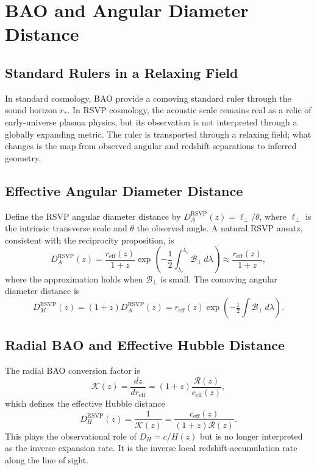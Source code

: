\documentclass[12pt,a4paper]{article}
\theoremstyle{remark}
\newcommand{\Rcal}{\mathcal{R}}
\newcommand{\Bcal}{\mathcal{B}}
\newcommand{\reff}{r_{\mathrm{eff}}}
\newcommand{\DAr}{D_A^{\mathrm{RSVP}}}
\newcommand{\DHr}{D_H^{\mathrm{RSVP}}}
\newcommand{\DMr}{D_M^{\mathrm{RSVP}}}
\newcommand{\ceff}{c_{\mathrm{eff}}}
\begin{document}
\section{BAO and Angular Diameter Distance}
\label{sec:bao}

\subsection{Standard Rulers in a Relaxing Field}

In standard cosmology, BAO provide a comoving standard ruler through the sound horizon $r_\ast$. In RSVP cosmology, the acoustic scale remains real as a relic of early-universe plasma physics, but its observation is not interpreted through a globally expanding metric. The ruler is transported through a relaxing field; what changes is the map from observed angular and redshift separations to inferred geometry.

\subsection{Effective Angular Diameter Distance}

Define the RSVP angular diameter distance by $\DAr(z) = \ell_\perp / \theta$, where $\ell_\perp$ is the intrinsic transverse scale and $\theta$ the observed angle. A natural RSVP ansatz, consistent with the reciprocity proposition, is
\begin{equation}
\DAr(z) = \frac{\reff(z)}{1+z} \exp\!\left(-\frac12\int_{\lambda_e}^{\lambda_o}\Bcal_\perp\, d\lambda\right) \approx \frac{\reff(z)}{1+z},
\end{equation}
where the approximation holds when $\Bcal_\perp$ is small. The comoving angular diameter distance is
\begin{equation}
\DMr(z) = (1+z)\DAr(z) = \reff(z)\exp\!\left(-\tfrac12\int\Bcal_\perp\, d\lambda\right).
\end{equation}

\subsection{Radial BAO and Effective Hubble Distance}

The radial BAO conversion factor is
\begin{equation}
\mathcal{K}(z) = \frac{dz}{d\reff} = (1+z)\frac{\Rcal(z)}{\ceff(z)},
\end{equation}
which defines the effective Hubble distance
\begin{equation}
\boxed{\DHr(z) = \frac{1}{\mathcal{K}(z)} = \frac{\ceff(z)}{(1+z)\Rcal(z)}.}
\end{equation}
This plays the observational role of $D_H = c/H(z)$ but is no longer interpreted as the inverse expansion rate. It is the inverse local redshift-accumulation rate along the line of sight.
\end{document}
